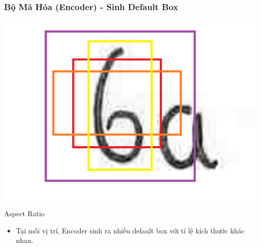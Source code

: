 \documentclass{beamer}
\begin{document}
	\begin{frame}
		\frametitle{Bộ Mã Hóa (Encoder) - Sinh Default Box}
		\begin{center}
			\centering
			\includegraphics[width=0.5\linewidth]{aspect.png}
		\end{center}
		\begin{block}{Aspect Ratio}
			\begin{itemize}
				\item Tại mỗi vị trí, Encoder sinh ra nhiều default box với tỉ lệ kích thước khác nhau.
			\end{itemize}
		\end{block}
	\end{frame}
	
	
\end{document}
